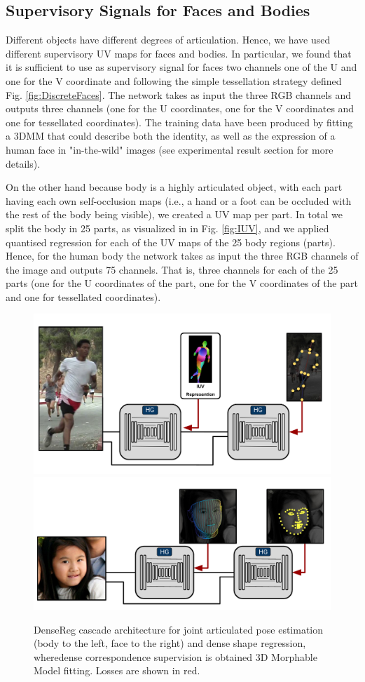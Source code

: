 \subsection{Supervisory Signals for Faces and Bodies}
\label{sec: supervisory_signal}

Different objects have different degrees of articulation. Hence, we have used different supervisory UV maps for faces and bodies. In particular, we found that it is sufficient to use as supervisory signal for faces two channels one of the U and one for the V coordinate and following the simple tessellation strategy defined Fig. \ref{fig:DiscreteFaces}. The network takes as input the three RGB channels and outputs three channels (one for the U coordinates, one for the V coordinates and one for tessellated coordinates). The training data have been produced by fitting a 3DMM that could describe both the identity, as well as the expression of a human face in "in-the-wild" images (see experimental result section for more details). 

On the other hand because body is a highly articulated object, with each part having each own self-occlusion maps (i.e., a hand or a foot can be occluded with the rest of the body being visible), we created a UV map per part. In total we split the body in 25 parts, as visualized in in Fig. \ref{fig:IUV}, and we applied quantised regression for each of the UV maps of the 25 body regions (parts). Hence, for the human body the network takes as input the three RGB channels of the image and outputs 75 channels. That is, three channels for each of the 25 parts (one for the U coordinates of the part, one for the V coordinates of the part and one for tessellated coordinates). 

\begin{figure}[ht]
\begin{center}
    \includegraphics[width=0.49 \linewidth ]{resources/Human_Poses/PoseReg_Frontpage4-2}
    \includegraphics[width=0.49 \linewidth ]{resources/Human_Poses/PoseReg_Frontpage5-2}
\end{center}
    \caption{DenseReg cascade architecture for joint articulated pose estimation (body to the left, face to the right) and dense shape regression, wheredense correspondence supervision is obtained 3D Morphable Model fitting. Losses are shown in red. }
\label{fig:cascadeBody}
\end{figure}

